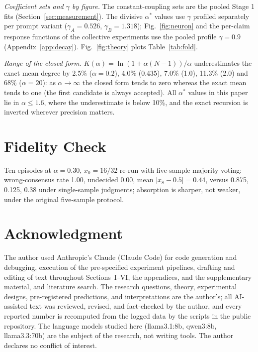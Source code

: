 \documentclass{ieeeaccess}
\newcommand{\astar}{\alpha^{*}}
\begin{document}
\emph{Coefficient sets and $\gamma$ by figure.} The constant-coupling sets are
the pooled Stage 1 fits (Section~\ref{sec:measurement}). The divisive $\astar$ values
use $\gamma$ profiled separately per prompt variant ($\gamma_A = 0.526$,
$\gamma_B = 1.318$); Fig.~\ref{fig:neuron} and the per-claim response
functions of the collective experiments use the pooled profile $\gamma = 0.9$
(Appendix~\ref{app:decay}). Fig.~\ref{fig:theory} plots Table~\ref{tab:fold}.

\emph{Range of the closed form.} $\bar K(\alpha) = \ln(1 + \alpha(N-1))/\alpha$
underestimates the exact mean degree by 2.5\% ($\alpha = 0.2$), 4.0\%
(0.435), 7.0\% (1.0), 11.3\% (2.0) and 68\% ($\alpha = 20$): as
$\alpha \to \infty$ the closed form tends to zero whereas the exact mean tends
to one (the first candidate is always accepted). All $\astar$ values in this
paper lie in $\alpha \le 1.6$, where the underestimate is below 10\%, and the
exact recursion is inverted wherever precision matters.


\section{Fidelity Check}\label{app:fidelity}

Ten episodes at $\alpha = 0.30$, $x_0 = 16/32$ re-run with five-sample
majority voting: wrong-consensus rate 1.00, undecided 0.00, mean
$|x_8 - 0.5| = 0.44$, versus 0.875, 0.125, 0.38 under single-sample
judgments; absorption is sharper, not weaker, under the original
five-sample protocol.


\section*{Acknowledgment}
The author used Anthropic's Claude (Claude Code) for code generation and
debugging, execution of the pre-specified experiment pipelines, drafting
and editing of text throughout Sections~I--VI, the appendices, and the
supplementary material, and literature search. The research questions,
theory, experimental designs, pre-registered predictions, and
interpretations are the author's; all AI-assisted text was reviewed,
revised, and fact-checked by the author, and every reported number is
recomputed from the logged data by the scripts in the public repository.
The language models studied here (llama3.1:8b, qwen3:8b, llama3.3:70b) are
the subject of the research, not writing tools. The author declares no
conflict of interest.



\end{document}
